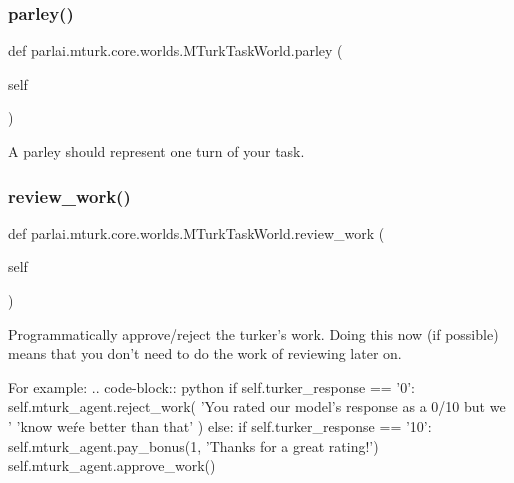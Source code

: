 \subsubsection{\texorpdfstring{parley()}{parley()}}
{\footnotesize\ttfamily def parlai.\+mturk.\+core.\+worlds.\+M\+Turk\+Task\+World.\+parley (\begin{DoxyParamCaption}\item[{}]{self }\end{DoxyParamCaption})}

\begin{DoxyVerb}A parley should represent one turn of your task.
\end{DoxyVerb}
 \mbox{\label{classparlai_1_1mturk_1_1core_1_1worlds_1_1MTurkTaskWorld_ac601ef19c221a1ec43ecbaa322ff67a4}} 
\subsubsection{\texorpdfstring{review\+\_\+work()}{review\_work()}}
{\footnotesize\ttfamily def parlai.\+mturk.\+core.\+worlds.\+M\+Turk\+Task\+World.\+review\+\_\+work (\begin{DoxyParamCaption}\item[{}]{self }\end{DoxyParamCaption})}

\begin{DoxyVerb}Programmatically approve/reject the turker's work. Doing this now (if possible)
means that you don't need to do the work of reviewing later on.

For example:
.. code-block:: python
    if self.turker_response == '0':
self.mturk_agent.reject_work(
    'You rated our model's response as a 0/10 but we '
    'know we\'re better than that'
)
    else:
if self.turker_response == '10':
    self.mturk_agent.pay_bonus(1, 'Thanks for a great rating!')
self.mturk_agent.approve_work()
\end{DoxyVerb}
 \mbox{\label{classparlai_1_1mturk_1_1core_1_1worlds_1_1MTurkTaskWorld_a4c084c5ba931d4c241fc6f4046a8c5e8}} 

